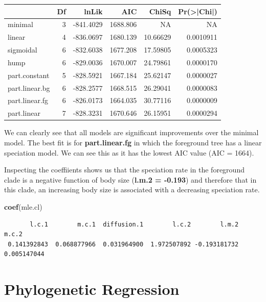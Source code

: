 \documentclass[
]{book}
\newenvironment{Shaded}{\begin{snugshade}}{\end{snugshade}}
\newcommand{\KeywordTok}[1]{\textcolor[rgb]{0.13,0.29,0.53}{\textbf{#1}}}
\newcommand{\NormalTok}[1]{#1}
\begin{document}
\begin{tabular}{l|r|r|r|r|r}
\hline
  & Df & lnLik & AIC & ChiSq & Pr(>|Chi|)\\
\hline
minimal & 3 & -841.4029 & 1688.806 & NA & NA\\
\hline
linear & 4 & -836.0697 & 1680.139 & 10.66629 & 0.0010911\\
\hline
sigmoidal & 6 & -832.6038 & 1677.208 & 17.59805 & 0.0005323\\
\hline
hump & 6 & -829.0036 & 1670.007 & 24.79861 & 0.0000170\\
\hline
part.constant & 5 & -828.5921 & 1667.184 & 25.62147 & 0.0000027\\
\hline
part.linear.bg & 6 & -828.2577 & 1668.515 & 26.29041 & 0.0000083\\
\hline
part.linear.fg & 6 & -826.0173 & 1664.035 & 30.77116 & 0.0000009\\
\hline
part.linear & 7 & -828.3231 & 1670.646 & 26.15951 & 0.0000294\\
\hline
\end{tabular}

We can clearly see that all models are significant improvements over the minimal model. The best fit is for \textbf{part.linear.fg} in which the foreground tree has a linear speciation model. We can see this as it has the lowest AIC value (AIC = 1664).

Inspecting the coeffiients shows us that the speciation rate in the foreground clade is a negative function of body size (\textbf{l.m.2 = -0.193}) and therefore that in this clade, an increasing body size is associated with a decreasing speciation rate.

\begin{Shaded}
\begin{Highlighting}[]
\KeywordTok{coef}\NormalTok{(mle.cl)}
\end{Highlighting}
\end{Shaded}

\begin{verbatim}
       l.c.1        m.c.1  diffusion.1        l.c.2        l.m.2        m.c.2 
 0.141392843  0.068877966  0.031964900  1.972507892 -0.193181732  0.005147044 
\end{verbatim}

\hypertarget{w2PGLS}{%
\chapter{Phylogenetic Regression}\label{w2PGLS}}
\end{document}
